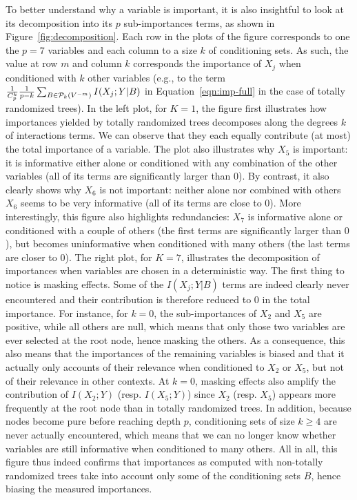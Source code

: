 To better understand why a variable is important, it is also insightful to look
at its decomposition into its $p$ sub-importances terms, as shown in
Figure~\ref{fig:decomposition}. Each row in the plots of the figure corresponds
to one the $p=7$ variables and each column to a size $k$ of conditioning sets.
As such, the value at row $m$ and column $k$ corresponds the importance of $X_j$
when conditioned with $k$ other variables (e.g., to the term $\frac{1}{C^k_p}
\frac{1}{p-k} \sum_{B \in {\cal P}_k(V^{-m})} I(X_j;Y|B)$ in Equation~\ref{eqn:imp-full}
in the case of totally randomized trees). In the left plot, for
$K=1$, the figure first illustrates how importances yielded by totally
randomized trees decomposes along the degrees $k$ of interactions terms. We can
observe that they each equally contribute (at most) the total importance of a
variable. The plot also illustrates why $X_5$ is important: it is informative
either alone or conditioned with any combination of the other variables (all of
its terms are significantly larger than $0$). By contrast, it also clearly shows
why $X_6$ is not important: neither alone nor combined with others $X_6$ seems
to be very informative (all of its terms are close to $0$). More interestingly,
this figure also highlights redundancies: $X_7$ is informative alone or
conditioned with a couple of others (the first terms are significantly larger
than $0$), but becomes uninformative  when conditioned with
many others (the last terms are closer to $0$). The right plot, for $K=7$,
illustrates the decomposition of importances when variables are chosen in a
deterministic way. The first thing to notice is masking effects. Some of the
$I(X_j;Y|B)$ terms are indeed clearly never encountered and their contribution
is therefore reduced to $0$ in the total importance. For instance, for $k=0$,
the sub-importances of $X_2$ and $X_5$ are positive, while all others are null,
which means that only those two variables are ever selected at the root node,
hence masking the others. As a consequence, this also means that the importances
of the remaining variables is biased and that it actually only accounts of their
relevance when conditioned to $X_2$ or $X_5$, but not of their relevance in
other contexts. At $k=0$, masking effects also amplify the contribution of $I(X_2;Y)$
(resp. $I(X_5;Y)$) since $X_2$ (resp. $X_5$) appears more frequently at the root
node than in totally randomized trees. In addition, because nodes become pure
before reaching depth $p$, conditioning sets of size $k\geq4$ are never actually
encountered, which means that we can no longer know whether variables are still
informative when conditioned to many others. All in all, this figure thus indeed
confirms that importances as computed with non-totally randomized trees take
into account only some of the conditioning sets $B$, hence biasing the measured
importances.


